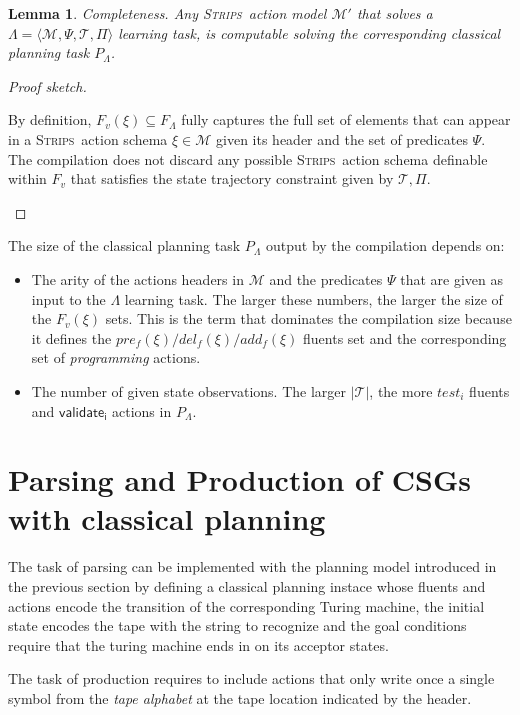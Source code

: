\documentclass[letterpaper]{article} %
\newcommand{\tup}[1]{{\langle #1 \rangle}}
\newcommand{\strips}{\textsc{Strips}}     %
\newtheorem{lemma}[theorem]{Lemma}
\begin{document}
\begin{lemma}
Completeness. Any \strips\ action model $\mathcal{M}'$ that solves a $\Lambda=\tup{\mathcal{M},\Psi,\mathcal{T},\Pi}$ learning task, is computable solving the corresponding classical planning task $P_{\Lambda}$.
\end{lemma}

\begin{proof}[Proof sketch]
\begin{small}
By definition, $F_v(\xi)\subseteq F_\Lambda$ fully captures the full set of elements that can appear in a \strips\ action schema $\xi\in\mathcal{M}$ given its header and the set of predicates $\Psi$. The compilation does not discard any possible \strips\ action schema definable within $F_v$ that satisfies the state trajectory constraint given by $\mathcal{T},\Pi$.
\end{small}
\end{proof}

The size of the classical planning task $P_{\Lambda}$ output by the compilation depends on:
\begin{itemize}
\item The arity of the actions headers in $\mathcal{M}$ and the predicates $\Psi$ that are given as input to the $\Lambda$ learning task. The larger these numbers, the larger the size of the $F_v(\xi)$ sets. This is the term that dominates the compilation size because it defines the $pre_f(\xi)/del_f(\xi)/add_f(\xi)$ fluents set and the corresponding set of {\em programming} actions.
\item The number of given state observations. The larger $|\mathcal{T}|$, the more $test_i$ fluents and $\mathsf{validate_{i}}$ actions in $P_{\Lambda}$.
\end{itemize}



\section{Parsing and Production of CSGs with classical planning}
The task of parsing can be implemented with the planning model introduced in the previous section by defining a classical planning instace whose fluents and actions encode the transition of the corresponding Turing machine, the initial state encodes the tape with the string to recognize and the goal conditions require that the turing machine ends in on its acceptor states.

The task of production requires to include actions that only write once a single symbol from the {\em tape alphabet} at the tape location indicated by the header.
\end{document}
